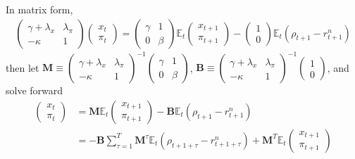 \documentclass[10pt,landscape,a4paper]{article}
\begin{document}
\begin{multicols*}{3}
In matrix form,
\begin{align*}
    \begin{pmatrix}
    \gamma+\lambda_x & \lambda_{\pi} \\
    -\kappa & 1
    \end{pmatrix}
    \begin{pmatrix}x_t\\ \pi_t \end{pmatrix} = \begin{pmatrix}
    \gamma & 1\\
    0 & \beta 
    \end{pmatrix}\mathbb{E}_t\begin{pmatrix}x_{t+1}\\ \pi_{t+1}\end{pmatrix} - \begin{pmatrix}
    1\\ 0
    \end{pmatrix}\mathbb{E}_t(\rho_{t+1}-r^n_{t+1})
\end{align*}
then let $\mathbf{M} \equiv \begin{pmatrix}
    \gamma+\lambda_x & \lambda_{\pi} \\
    -\kappa & 1
    \end{pmatrix}^{-1}\begin{pmatrix}
    \gamma & 1\\
    0 & \beta 
    \end{pmatrix}$, $\mathbf{B}\equiv\begin{pmatrix}
    \gamma+\lambda_x & \lambda_{\pi} \\
    -\kappa & 1
    \end{pmatrix}^{-1}\begin{pmatrix}
    1\\ 0
    \end{pmatrix}$, and solve forward
\begin{align*}
    \begin{pmatrix} 
    x_t\\ \pi_t 
    \end{pmatrix} &= 
    \mathbf{M} \mathbb{E}_t\begin{pmatrix}
    x_{t+1}\\ \pi_{t+1}\end{pmatrix} 
    - \mathbf{B}\mathbb{E}_t(\rho_{t+1}-r^n_{t+1}) \\
    &= -\mathbf{B}\sum^{T}_{\tau=1}\mathbf{M}^{\tau}\mathbb{E}_t(\rho_{t+1+\tau}-r^n_{t+1+\tau}) + \mathbf{M}^T\mathbb{E}_t\begin{pmatrix}x_{t+1}\\ \pi_{t+1}\end{pmatrix}

\end{align*}
\end{multicols*}
\end{document}
